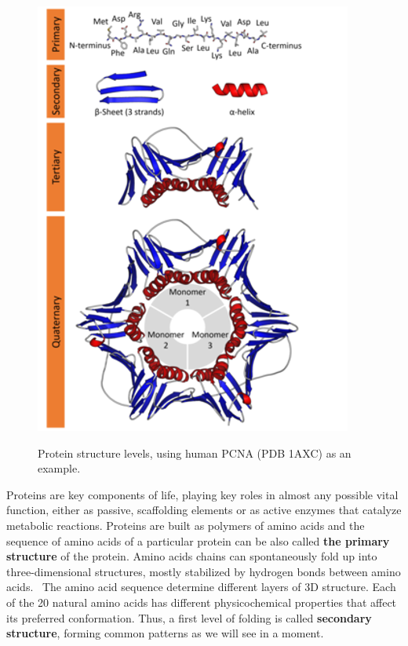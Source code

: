 \documentclass[
  letterpaper,
  DIV=11,
  numbers=noendperiod]{scrreprt}
\begin{document}
\begin{figure}

{\centering 

\href{https://en.wikipedia.org/wiki/Protein_structure}{\includegraphics{./pics/Protein_structure.png}}

}

\caption{Protein structure levels, using human PCNA (PDB 1AXC) as an
example.}

\end{figure}

Proteins are key components of life, playing key roles in almost any
possible vital function, either as passive, scaffolding elements or as
active enzymes that catalyze metabolic reactions. Proteins are built as
polymers of amino acids and the sequence of amino acids of a particular
protein can be also called \textbf{the primary structure} of the
protein. Amino acids chains can spontaneously fold up into
three-dimensional structures, mostly stabilized by hydrogen bonds
between amino acids.~ The amino acid sequence determine different layers
of 3D structure. Each of the 20 natural amino acids has different
physicochemical properties that affect its preferred conformation. Thus,
a first level of folding is called \textbf{secondary structure}, forming
common patterns as we will see in a moment.
\end{document}

